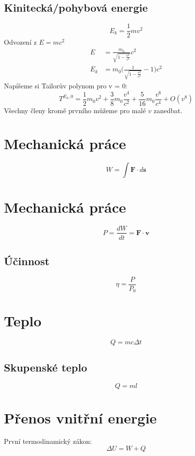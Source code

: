 \documentclass[titlepage]{report}
\begin{document}
\subsection{Kinitecká/pohybová energie}
\begin{equation}
E_k = \frac{1}{2}mv^2
\end{equation}
Odvození z $E = mc^2$
\begin{align}
E &= \frac{m_0}{\sqrt{1 - \frac{v^2}{c^2}}}c^2\\
E_k &= m_0 \Big(\frac{1}{\sqrt{1 - \frac{v^2}{c^2}}} - 1\Big)c^2
\end{align}
Napíšeme si Tailorův polynom pro v = 0:
\begin{equation}
T^{E_k,0} = \frac{1}{2}m_0v^2 + \frac{3}{8}m_0\frac{v^4}{c^2} + \frac{5}{16}m_0\frac{v^6}{c^4} + O(v^8)
\end{equation}
Všechny členy kromě prvního můžeme pro malé $v$ zanedbat.
\section{Mechanická práce}
\begin{equation}
W = \int \boldsymbol F \cdot d\boldsymbol s
\end{equation}
\section{Mechanická práce}
\begin{equation}
P = \frac{dW}{dt} = \boldsymbol F \cdot \boldsymbol v
\end{equation}
\subsection{Účinnost}
\begin{equation}
\eta = \frac{P}{P_0}
\end{equation}
\section{Teplo}
\begin{equation}
Q = mc\Delta t
\end{equation}
\subsection{Skupenské teplo}
\begin{equation}
Q = m l
\end{equation}
\section{Přenos vnitřní energie}
První termodinamický zákon:
\begin{equation}
\Delta U = W + Q
\end{equation}
\end{document}
